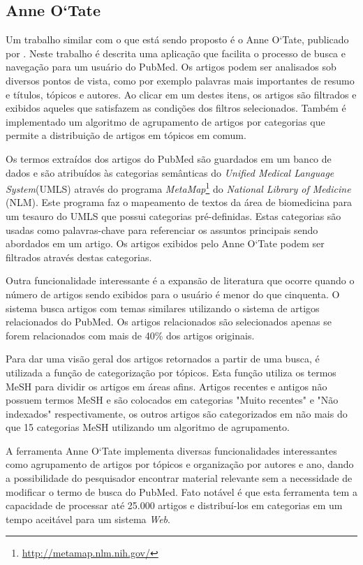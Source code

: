 \subsection{Anne O`Tate}
Um trabalho similar com o que está sendo proposto é o Anne O`Tate, publicado por \cite{Smalheiser2008}. Neste trabalho é descrita uma aplicação que facilita o processo de busca e navegação para um usuário do PubMed. Os artigos podem ser analisados sob diversos pontos de vista, como por exemplo palavras mais importantes de resumo e títulos, tópicos e autores. Ao clicar em um destes itens, os artigos são filtrados e exibidos aqueles que satisfazem as condições dos filtros selecionados. Também é implementado um algoritmo de agrupamento de artigos por categorias que permite a distribuição de artigos em tópicos em comum.

Os termos extraídos dos artigos do PubMed são guardados em um banco de dados e são atribuídos às categorias semânticas do \emph{Unified Medical Language System}(UMLS) através do programa \emph{MetaMap}\footnote{\href{http://metamap.nlm.nih.gov/}{http://metamap.nlm.nih.gov/}} do \emph{National Library of Medicine} (NLM). Este programa faz o mapeamento de textos da área de biomedicina para um tesauro do UMLS que  possui categorias pré-definidas. Estas categorias são usadas como palavras-chave para referenciar os assuntos principais sendo abordados em um artigo. Os artigos exibidos pelo Anne O`Tate podem ser filtrados através destas categorias.

Outra funcionalidade interessante é a expansão de literatura que ocorre quando o número de artigos sendo exibidos para o usuário é menor do que cinquenta. O sistema busca artigos com temas similares utilizando o sistema de artigos relacionados do PubMed. Os artigos relacionados são selecionados apenas se forem relacionados com mais de 40\% dos artigos originais.

Para dar uma visão geral dos artigos retornados a partir de uma busca, é utilizada a função de categorização por tópicos. Esta função utiliza os termos MeSH para dividir os artigos em áreas afins. Artigos recentes e antigos não possuem termos MeSH e são colocados em categorias "Muito recentes" e "Não indexados" respectivamente, os outros artigos são categorizados em não mais do que 15 categorias MeSH utilizando um algoritmo de agrupamento.

A ferramenta Anne O`Tate implementa diversas funcionalidades interessantes como agrupamento de artigos por tópicos e organização por autores e ano, dando a possibilidade do pesquisador encontrar material relevante sem a necessidade de modificar o termo de busca do PubMed. Fato notável é que esta ferramenta tem a capacidade de processar até 25.000 artigos e distribuí-los em categorias em um tempo aceitável para um sistema \emph{Web}.

